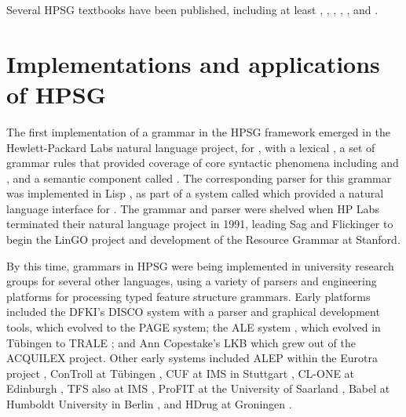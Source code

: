 \documentclass[output=paper
 	        ,biblatex
                ,babelshorthands
                ,newtxmath
                ,draftmode
                ,colorlinks, citecolor=brown
]{langscibook}
\begin{document}
Several HPSG textbooks have been published, including at least \citet{Borsley91a,Borsley96a-u}, \citet{SagW99a-u}, \citet*{SWB2003a}, \citet{MuellerLehrbuch1,MuellerGTBuch2,MuellerGT-Eng4}, \citet{Kim2016a-u}, and \citet{Levine2017a-u}.   

\section{Implementations and applications of HPSG}

The first implementation of a grammar in the HPSG framework emerged in the Hewlett-Packard Labs natural language project, for , with a lexical  \citep*{FPW85a}, a set of grammar rules that provided coverage of core syntactic phenomena including  and , and a semantic component called  \citep{LaubNerb1991}.  The corresponding parser for this grammar was implemented in Lisp \citep{PP85}, as part of a system called  \citep{NerProud1987} which provided a natural language interface for .  The grammar and parser were shelved when HP Labs terminated their natural language project in 1991, leading Sag and Flickinger to begin the LinGO project and development of the  Resource Grammar at Stanford.

By this time, grammars in HPSG were being implemented in university research groups for several other languages, using a variety of parsers and engineering platforms for processing typed feature structure grammars.  Early platforms included the DFKI's DISCO system \citep{DISCO94} with a parser and graphical development tools, which evolved to the PAGE system; the ALE system \citep{Franz:90,CP96}, which evolved in Tübingen to TRALE \citep*{MPR2002a-u,Penn2004a-u}; and Ann Copestake's LKB\indexlkb \citep{Copestake2002a} which grew out of the ACQUILEX project.  Other early systems included ALEP within the Eurotra project \citep{SimpGron1994}, ConTroll at Tübingen \citep{GoetzMeurers1997}, CUF at IMS in Stuttgart \citep{DD93a-u}, CL-ONE at Edinburgh \citep{Manandhar1994}, TFS also at IMS \citep{Emele94a-u}, ProFIT at the University of Saarland \citep{Erbach95a}, Babel at Humboldt University in Berlin \citep{Babel}, and HDrug at Groningen \citep{NB97b-u}.  
\end{document}
